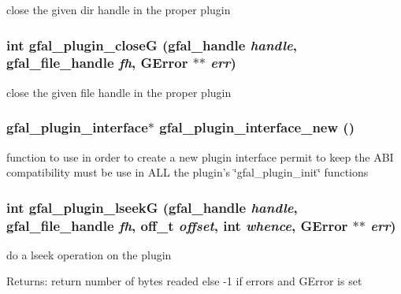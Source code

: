 close the given dir handle in the proper plugin 
\subsubsection{\setlength{\rightskip}{0pt plus 5cm}int gfal\_\-plugin\_\-close\-G (gfal\_\-handle {\em handle}, gfal\_\-file\_\-handle {\em fh}, GError $\ast$$\ast$ {\em err})}\label{gfal__common__plugin_8h_13d1db9798e5a830c745e2f909a484f4}


close the given file handle in the proper plugin 
\subsubsection{\setlength{\rightskip}{0pt plus 5cm}\bf{gfal\_\-plugin\_\-interface}$\ast$ gfal\_\-plugin\_\-interface\_\-new ()}\label{gfal__common__plugin_8h_6ecd3253665d357ecf47bad157e24e63}


function to use in order to create a new plugin interface permit to keep the ABI compatibility must be use in ALL the plugin's \char`\"{}gfal\_\-plugin\_\-init\char`\"{} functions 
\subsubsection{\setlength{\rightskip}{0pt plus 5cm}int gfal\_\-plugin\_\-lseek\-G (gfal\_\-handle {\em handle}, gfal\_\-file\_\-handle {\em fh}, off\_\-t {\em offset}, int {\em whence}, GError $\ast$$\ast$ {\em err})}\label{gfal__common__plugin_8h_c29b06ae43aa86049b513d1174393019}


do a lseek operation on the plugin \begin{Desc}
\item[Returns:]return number of bytes readed else -1 if errors and GError is set \end{Desc}
